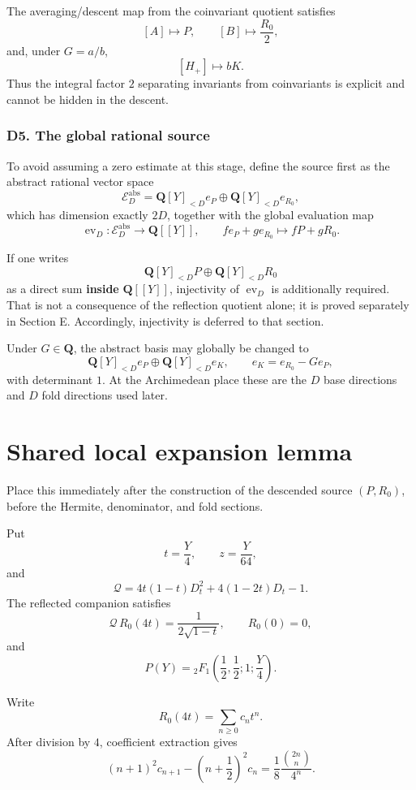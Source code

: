 \documentclass[
  10pt,
  letterpaper,
]{article}
\theoremstyle{definition}
\theoremstyle{remark}
\begin{document}
The averaging/descent map from the coinvariant quotient satisfies \[
[A]\longmapsto P,
\qquad
[B]\longmapsto \frac{R_0}{2},
\] and, under \(G=a/b\), \[
[H_+]\longmapsto bK.
\] Thus the integral factor \(2\) separating invariants from
coinvariants is explicit and cannot be hidden in the descent.

\subsubsection{D5. The global rational
source}\label{d5.-the-global-rational-source}

To avoid assuming a zero estimate at this stage, define the source first
as the abstract rational vector space \[
\boxed{
\mathcal E_D^{\mathrm{abs}}
=
\mathbf Q[Y]_{<D}e_P
\oplus
\mathbf Q[Y]_{<D}e_{R_0},
}
\] which has dimension exactly \(2D\), together with the global
evaluation map \[
\operatorname{ev}_D:\mathcal E_D^{\mathrm{abs}}\longrightarrow\mathbf Q[[Y]],
\qquad
f e_P+g e_{R_0}\longmapsto fP+gR_0.
\]

If one writes \[
\mathbf Q[Y]_{<D}P\oplus\mathbf Q[Y]_{<D}R_0
\] as a direct sum \textbf{inside} \(\mathbf Q[[Y]]\), injectivity of
\(\operatorname{ev}_D\) is additionally required. That is not a
consequence of the reflection quotient alone; it is proved separately in
Section E. Accordingly, injectivity is deferred to that section.

Under \(G\in\mathbf Q\), the abstract basis may globally be changed to
\[
\mathbf Q[Y]_{<D}e_P
\oplus
\mathbf Q[Y]_{<D}e_K,
\qquad e_K=e_{R_0}-G e_P,
\] with determinant \(1\). At the Archimedean place these are the \(D\)
base directions and \(D\) fold directions used later.

\section{Shared local expansion
lemma}\label{shared-local-expansion-lemma}

Place this immediately after the construction of the descended source
\((P,R_0)\), before the Hermite, denominator, and fold sections.

Put \[
t=\frac Y4,\qquad z=\frac Y{64},
\] and \[
\mathscr Q=4t(1-t)D_t^2+4(1-2t)D_t-1.
\] The reflected companion satisfies \[
\mathscr Q\,R_0(4t)=\frac1{2\sqrt{1-t}},
\qquad R_0(0)=0,
\] and \[
P(Y)={}_2F_1\!\left(\frac12,\frac12;1;\frac Y4\right).
\]

Write \[
R_0(4t)=\sum_{n\ge0}c_nt^n.
\] After division by \(4\), coefficient extraction gives \[
(n+1)^2c_{n+1}-\left(n+\frac12\right)^2c_n
=
\frac18\frac{\binom{2n}{n}}{4^n}.
\tag{S0.1}
\]
\end{document}

